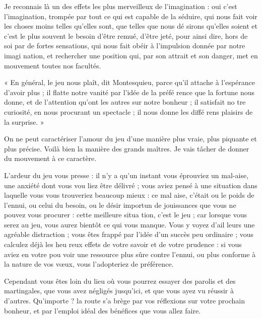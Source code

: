 Je reconnais là un des effets les
plus merveilleux de l'imagination : oui
c'est l'imagination, trompée par tout
ce qui est capable de la séduire, qui
nous fait voir les choses moins telles
qu'elles sont, que telles que nous dé%
sirons qu'elles soient et c'est le plus
souvent le besoin d'être remué, d'être
jeté, pour ainsi dire, hors de soi par de
fortes sensations, qui nous fait obéir
à l'impulsion donnée par notre imagi%
nation, et rechercher une position
qui, par son attrait et son danger, met
en mouvement toutes nos facultés.

« En général, le jeu nous plaît, dit
Montesquieu, parce qu'il attache
à l'espérance d'avoir plus ; il flatte
notre vanité par l'idée de la préfé%
rence que la fortune nous donne,
et de l'attention qu'ont les autres
sur notre bonheur ; il satisfait no%
tre curiosité, en nous procurant un
spectacle ; il nous donne les diffé%
rens plaisirs de la surprise. »

On ne peut caractériser l'amour
du jeu d'une manière plus vraie, plus
piquante et plus précise. Voilà bien
la manière des grands maîtres. Je vais
tâcher de donner du mouvement à ce
caractère.

L'ardeur du jeu vous presse : il n'y
a qu'un instant vous éprouviez un
mal-aise, une anxiété dont vous vou%
liez être délivré ; vous aviez pensé à
une situation dans laquelle vous vous
trouveriez beaucoup mieux : ce mal%
aise, c'était ou le poids de l'ennui, ou
celui du besoin, ou le désir importun
de jouissances que vous ne pouvez
vous procurer : cette meilleure situa%
tion, c'est le jeu ; car lorsque vous
serez au jeu, vous aurez bientôt ce
qui vous manque. Vous y voyez d'ail%
leurs une agréable distraction ; vous
êtes frappé par l'idée d'un succès peu
ordinaire ; vous calculez déjà les heu%
reux effets de votre savoir et de votre
prudence : si vous aviez en votre pou%
voir une ressource plus sûre contre
l'ennui, ou plus conforme à la nature
de vos vœux, vous l'adopteriez de
préférence.

Cependant vous êtes loin du lieu où
vous pourrez essayer des parolis et des
martingales, que vous avez négligés
jusqu'ici, et que vous ayez vu réussir
à d'autres. Qu'importe ? la route s'a%
brège par vos réflexions sur votre
prochain bonheur, et par l'emploi
idéal des bénéfices que vous allez faire.

